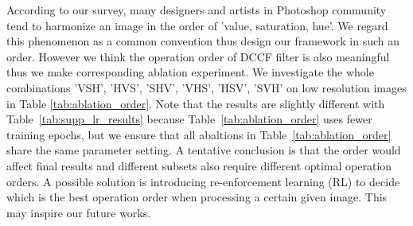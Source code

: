 \documentclass[runningheads]{llncs}
\begin{document}
   According to our survey, many designers and artists in Photoshop community tend to harmonize an image in the order of 'value, saturation, hue'. We regard this phenomenon as a common convention thus design our framework in such an order.
   However we think the operation order of DCCF filter is also meaningful thus we make corresponding ablation experiment.
   We investigate the whole  combinations
   'VSH', 'HVS', 'SHV', 'VHS', 'HSV', 'SVH' 
   on low resolution images in Table \ref{tab:ablation_order}. Note that the results are slightly different with Table~\ref{tab:supp_lr_results} because Table~\ref{tab:ablation_order} uses fewer training epochs, but we ensure that all abaltions in Table~\ref{tab:ablation_order} share the same parameter setting. 
   A tentative conclusion is that the order would affect final results and different subsets also require different optimal operation orders. 
   A possible solution is introducing re-enforcement learning (RL) to decide which is the best operation order when processing a certain given image. This may inspire our future works.

       \begin{table}[!htb]
           \scriptsize
               \centering
                 \vspace{7pt}
                 \caption{\textbf{Ablation study} of different orders.}
                 \label{tab:ablation_order}
           \vspace{-10pt}
       \end{table}
   
\end{document}
